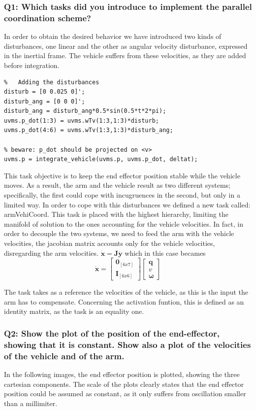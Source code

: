 \documentclass{article}
\begin{document}
\subsubsection{Q1: Which tasks did you introduce to implement the parallel coordination scheme?}
In order to obtain the desired behavior we have introduced two kinds of disturbances, one linear and the other as angular velocity disturbance, expressed in the inertial frame. The vehicle suffers from these velocities, as they are added before integration. 
\begin{lstlisting}
%	Adding the disturbances
disturb = [0 0.025 0]';
disturb_ang = [0 0 0]';
disturb_ang = disturb_ang*0.5*sin(0.5*t*2*pi);
uvms.p_dot(1:3) = uvms.wTv(1:3,1:3)*disturb;
uvms.p_dot(4:6) = uvms.wTv(1:3,1:3)*disturb_ang;
    
% beware: p_dot should be projected on <v>
uvms.p = integrate_vehicle(uvms.p, uvms.p_dot, deltat);
\end{lstlisting}
This task objective is to keep the end effector position stable while the vehicle moves. As a result, the arm and the vehicle result as two different systems; specifically, the first could cope with incugruences in the second, but only in a limited way.
In order to cope with this disturbances we defined a new task called: armVehiCoord.
This task is placed with the highest hierarchy, limiting the manifold of solution to the ones accounting for the vehicle velocities. In fact, in order to decouple the two systems, we need to feed the arm with the vehicle velocities, the jacobian matrix accounts only for the vehicle velocities, disregarding the arm velocities.
$ \bm{\dot{x}} = \bm{J\dot{y}} $ which in this case becames 
$$ \bm{\dot{x}} = \begin{bmatrix} \bm{0}_{[6x7]} \\ \bm{I}_{[6x6]} \end{bmatrix} \begin{bmatrix} \bm{q}   \\ \bm{\textit{v}} \\ \bm{\omega} \end{bmatrix} $$

The task takes as a reference the velocities of the vehicle, as this is the input the arm has to compensate. Concerning the activation funtion, this is defined as an identity matrix, as the task is an equality one. 



\subsubsection{Q2: Show the plot of the position of the end-effector, showing that it is constant. Show also a plot of the velocities of the vehicle and of the arm.}
In the following images, the end effector position is plotted, showing the three cartesian components. The scale of the plots clearly states that the end effector position could be assumed as constant, as it only suffers from oscillation smaller than a millimiter. 
\end{document}
